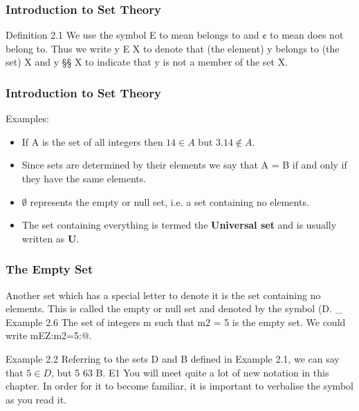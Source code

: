 %
%


\smallskip  %
\frametitle{Introduction to Set Theory}
\Large
Deﬁnition 2.1 
We use the symbol E to mean belongs to and ¢ to mean does not belong to.
Thus we write y E X to denote that (the element) y belongs to (the set) X and y §§ X to indicate
that y is not a member of the set X.
\smallskip  %
\frametitle{Introduction to Set Theory}
\Large
Examples:

\begin{itemize}
\item If A is the set of all integers then $14 \in A$ but $3.14 \notin A.$
\item Since sets are determined by their elements we say that A = B if and only
if they have the same elements.

\item $\emptyset$ represents the empty or null set, i.e. a set containing no elements.
\item The set containing everything is termed the \textbf{Universal set} and is usually
written as \textbf{U}.
\end{itemize}
\smallskip 
\smallskip 

\frametitle{The Empty Set}

Another set which has a special letter to denote it is the set containing no elements. This is called
the empty or null set and denoted by the symbol (D. _
Example 2.6 The set of integers m such that m2 = 5 is the empty set. We could write
{mEZ:m2=5}:@.
\smallskip 



Example 2.2 Referring to the sets D and B deﬁned in Example 2.1, we can say that $5 \in D$, but
5 63 B. E1
You will meet quite a lot of new notation in this chapter. In order for it to become familiar, it is
important to verbalise the symbol as you read it. 

